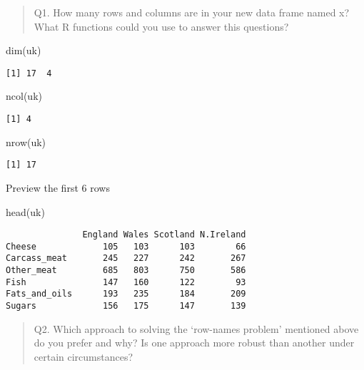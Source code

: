 \documentclass[
  letterpaper,
  DIV=11,
  numbers=noendperiod]{scrartcl}
\newenvironment{Shaded}{\begin{snugshade}}{\end{snugshade}}
\newcommand{\FunctionTok}[1]{\textcolor[rgb]{0.28,0.35,0.67}{#1}}
\newcommand{\NormalTok}[1]{\textcolor[rgb]{0.00,0.23,0.31}{#1}}
\begin{document}
\begin{quote}
Q1. How many rows and columns are in your new data frame named x? What R
functions could you use to answer this questions?
\end{quote}

\begin{Shaded}
\begin{Highlighting}[]
\FunctionTok{dim}\NormalTok{(uk)}
\end{Highlighting}
\end{Shaded}

\begin{verbatim}
[1] 17  4
\end{verbatim}

\begin{Shaded}
\begin{Highlighting}[]
\FunctionTok{ncol}\NormalTok{(uk)}
\end{Highlighting}
\end{Shaded}

\begin{verbatim}
[1] 4
\end{verbatim}

\begin{Shaded}
\begin{Highlighting}[]
\FunctionTok{nrow}\NormalTok{(uk)}
\end{Highlighting}
\end{Shaded}

\begin{verbatim}
[1] 17
\end{verbatim}

Preview the first 6 rows

\begin{Shaded}
\begin{Highlighting}[]
\FunctionTok{head}\NormalTok{(uk)}
\end{Highlighting}
\end{Shaded}

\begin{verbatim}
               England Wales Scotland N.Ireland
Cheese             105   103      103        66
Carcass_meat       245   227      242       267
Other_meat         685   803      750       586
Fish               147   160      122        93
Fats_and_oils      193   235      184       209
Sugars             156   175      147       139
\end{verbatim}

\begin{quote}
Q2. Which approach to solving the `row-names problem' mentioned above do
you prefer and why? Is one approach more robust than another under
certain circumstances?
\end{quote}
\end{document}
